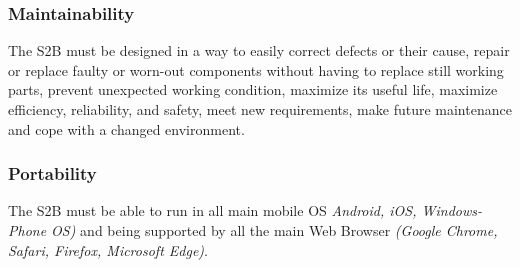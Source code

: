 	\subsubsection{Maintainability}
	The S2B must be designed in a way to easily correct defects or their cause,
	repair or replace faulty or worn-out components without having to replace still working parts,
	prevent unexpected working condition,
	maximize its useful life,
	maximize efficiency, reliability, and safety,
	meet new requirements,
	make future maintenance and
	cope with a changed environment.
	
	\subsubsection{Portability}
	The S2B must be able to run in all main mobile OS \textit{Android, iOS, Windows-Phone OS)} and being supported by all the main Web Browser \textit{(Google Chrome, Safari, Firefox, Microsoft Edge)}.
	

